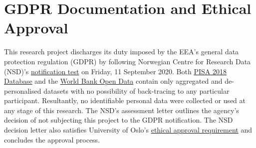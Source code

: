 \section{GDPR Documentation and Ethical Approval}

This research project discharges its duty imposed by the \textsc{EEA}'s general data protection regulation (\textsc{GDPR}) by following Norwegian Centre for Research Data (\textsc{NSD})'s \href{https://nsd.no/personvernombud/en/notify/notification_test.html}{notification test} on Friday, 11 September 2020. Both \href{https://www.oecd.org/pisa/data/2018database/}{\textsc{PISA} 2018 Database} and the \href{https://data.worldbank.org/}{World Bank Open Data} contain only aggregated and de-personalised datasets with no possibility of back-tracing to any particular participant. Resultantly, no identifiable personal data were collected or used at any stage of this research. The \textsc{NSD}'s assessment letter outlines the agency's decision of not subjecting this project to the \textsc{GDPR} notification. The \textsc{NSD} decision letter also satisfies University of Oslo's \href{https://www.uio.no/english/for-employees/support/research/funding/units/hf/imv/data-ethics/}{ethical approval requirement} and concludes the approval process.




